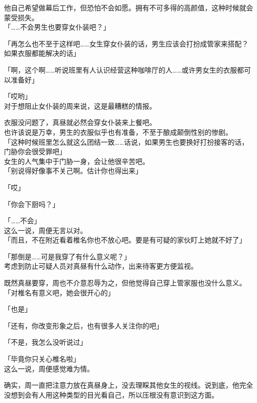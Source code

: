 他自己希望做幕后工作，但恐怕不会如愿。拥有不可多得的高颜值，这种时候就会蒙受损失。\\

「……不会男生也要穿女仆装吧？」

「再怎么也不至于这样吧……女生穿女仆装的话，男生应该会打扮成管家来搭配？如果衣服都能解决的话」

「啊，这个啊……听说班里有人认识经营这种咖啡厅的人……或许男女生的衣服都可以准备好」

「哎哟」\\

对于想阻止女仆装的周来说，这是最糟糕的情报。

衣服没问题了，真昼就必然会穿女仆装来上餐吧。\\

也许该说是万幸，男生的衣服似乎也有准备，不至于酿成颠倒性别的惨剧。\\

「这种时候班里怎么就这么团结一致……话说，如果男生也要换好打扮接客的话，门胁你会很受罪吧」\\

女生的人气集中于门胁一身，会让他很辛苦吧。\\

「别说得好像事不关己啊。估计你也得出来」

「哎」

「你会下厨吗？」

「……不会」\\

这么一说，周便无言以对。\\

「而且，不在附近看着椎名你也不放心吧。要是有可疑的家伙盯上她就不好了」

「那倒是……可是我穿了有什么意义呢？」\\

考虑到防止可疑人员对真昼有什么动作，出来待客更方便监视。

既然真昼要穿，周也不介意忍辱为之，但他觉得自己穿上管家服也没什么意义。\\

「对椎名有意义吧，她会很开心的」

「也是」

「还有，你改变形象之后，也有很多人关注你的吧」

「不是，我怎么没听说过」

「毕竟你只关心椎名啦」\\

这么一说，周便感觉难为情。

确实，周一直把注意力放在真昼身上，没去理睬其他女生的视线。说到底，他完全没想到会有人用这种类型的目光看自己，所以压根没有意识到这方面。\\

